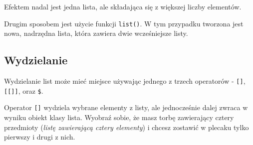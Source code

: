 \documentclass[paper=6in:9in,pagesize=pdftex,headinclude=on,footinclude=on,10pt]{scrbook}
\newenvironment{Shaded}{\begin{snugshade}}{\end{snugshade}}
\newcommand{\CommentTok}[1]{\textcolor[rgb]{0.56,0.35,0.01}{\textit{#1}}}
\newcommand{\DecValTok}[1]{\textcolor[rgb]{0.00,0.00,0.81}{#1}}
\newcommand{\KeywordTok}[1]{\textcolor[rgb]{0.13,0.29,0.53}{\textbf{#1}}}
\newcommand{\NormalTok}[1]{#1}
\newcommand{\StringTok}[1]{\textcolor[rgb]{0.31,0.60,0.02}{#1}}
\begin{document}
Efektem nadal jest jedna lista, ale składająca się z większej liczby elementów.

Drugim sposobem jest użycie funkcji \texttt{list()}.
W tym przypadku tworzona jest nowa, nadrzędna lista, która zawiera dwie wcześniejsze listy.

\begin{Shaded}
\end{Shaded}

\hypertarget{wydzielanie-list}{%
\subsection{Wydzielanie}\label{wydzielanie-list}}

Wydzielanie list może mieć miejsce używając jednego z trzech operatorów - \texttt{{[}{]}}, \texttt{{[}{[}{]}{]}}, oraz \texttt{\$}.

Operator \texttt{{[}{]}} wydziela wybrane elementy z listy, ale jednocześnie dalej zwraca w wyniku obiekt klasy lista.
Wyobraź sobie, że masz torbę zawierający cztery przedmioty (\emph{listę zawierającą cztery elementy}) i chcesz zostawić w plecaku tylko pierwszy i drugi z nich.

\begin{Shaded}
\end{Shaded}
\end{document}
